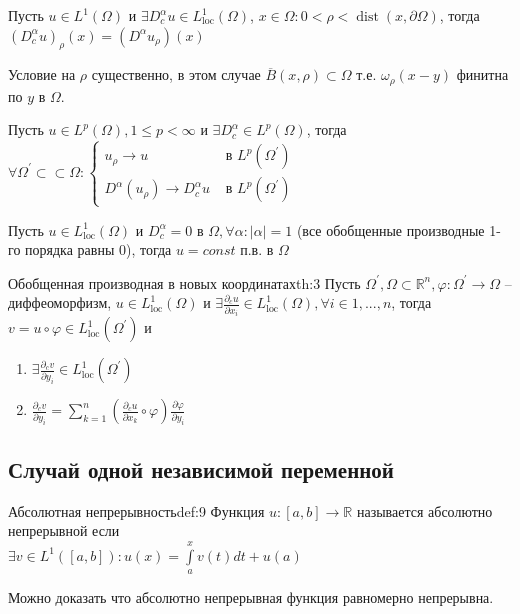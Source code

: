 \documentclass[12pt,a4paper]{article}
\newcommand{\Real}{\mathbb{R}}
\newcommand{\ssubset}{\subset \subset}
\DeclareMathOperator\dist{dist}
\begin{document}
\begin{lemma}{}{}
	Пусть $u \in L^1 (\Omega)$ и $\exists D_c^\alpha u \in L_{\text{loc}}^1 (\Omega)$, $x\in \Omega: 0 < \rho < \dist(x, \partial \Omega)$, тогда $(D_c^\alpha u)_\rho (x) = (D^\alpha u_\rho) (x)$
\end{lemma}
Условие на $\rho$ существенно, в этом случае $\overline{B}(x, \rho) \subset \Omega$ т.е. $\omega_\rho (x - y)$ финитна по $y$ в $\Omega$.

\begin{lemma}{}{}
	Пусть $u \in L^p (\Omega), 1 \leq p < \infty$ и $\exists D_c^\alpha \in L^p (\Omega)$, тогда $\forall \Omega^\prime \ssubset \Omega: 
	\begin{cases} 
		u_\rho \to u &\text{ в } L^p (\Omega^\prime) \\ 
		D^\alpha (u_\rho) \to D_c^\alpha u &\text{ в } L^p (\Omega^\prime)
	\end{cases}$
\end{lemma}

\begin{lemma}{}{}
	Пусть $u \in L_{\text{loc}}^1 (\Omega)$ и $D_c^\alpha = 0 \text{ в } \Omega, \forall \alpha: |\alpha| = 1$ (все обобщенные производные 1-го порядка равны 0), тогда $u = const$ п.в. в $\Omega$
\end{lemma}

\begin{theorem}{Обобщенная производная в новых координатах}{th:3}
	Пусть $\Omega^\prime, \Omega \subset \Real^n, \varphi: \Omega^\prime \to \Omega$ -- диффеоморфизм, $u \in L_{\text{loc}}^1 (\Omega)$ и $\exists \frac{\partial_c u}{\partial x_i} \in L_{\text{loc}}^1 (\Omega), \forall i \in {1, ..., n}$, тогда $v = u \circ \varphi \in L_{\text{loc}}^1 (\Omega^\prime)$ и
	\begin{enumerate}
		\item $\exists \frac{\partial_c v}{\partial y_i} \in L_{\text{loc}}^1 (\Omega^\prime)$
		\item $\frac{\partial_c v}{\partial y_i} = \sum\limits_{k=1}^{n}{(\frac{\partial_c u}{\partial x_k} \circ \varphi)\frac{\partial \varphi}{\partial y_i}}$
	\end{enumerate}
\end{theorem}

\subsection{Случай одной независимой переменной}

\begin{definition}{Абсолютная непрерывность}{def:9}
	Функция $u: [a, b] \to \Real$ называется абсолютно непрерывной если \\ $\exists v \in L^1 ([a, b]): u(x) = \int\limits_a^x{v(t)dt} + u(a)$
\end{definition}
Можно доказать что абсолютно непрерывная функция равномерно непрерывна.
\end{document}
